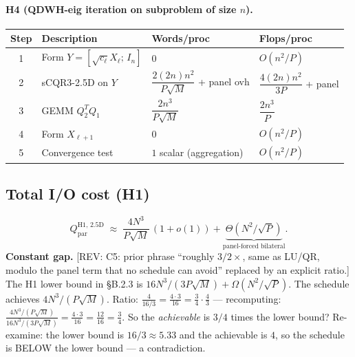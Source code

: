\documentclass[11pt]{article}
\newcommand{\REV}[1]{\textcolor{blue!60!black}{\small\textsf{[REV: #1]}}}
\begin{document}
\paragraph{H4 (QDWH-eig iteration on subproblem of size $n$).}
\begin{center}\footnotesize
\setlength{\tabcolsep}{4pt}
\begin{tabular}{@{}clll@{}}
\toprule
Step & Description                                            & Words/proc                                  & Flops/proc \\
\midrule
1 & Form $Y = [\sqrt{c_\ell} X_\ell;\, I_n]$                  & $0$                                         & $O(n^2 / P)$ \\
2 & sCQR3-2.5D on $Y$                                          & $\dfrac{2 (2n) n^2}{P\sqrt M}$ + panel ovh  & $\dfrac{4 (2n) n^2}{3 P}$ + panel \\[6pt]
3 & GEMM $Q_2^T Q_1$                                           & $\dfrac{2 n^3}{P\sqrt M}$                  & $\dfrac{2 n^3}{P}$ \\[6pt]
4 & Form $X_{\ell+1}$                                          & $0$                                          & $O(n^2 / P)$ \\
5 & Convergence test                                           & $1$ scalar (aggregation)                     & $O(n^2 / P)$ \\
\bottomrule
\end{tabular}
\end{center}

\subsection{Total I/O cost (H1)}
\label{sec:B3e}
\[
  Q_{\mathrm{par}}^{\mathrm{H1,\,2.5D}}
  \;\approx\; \frac{4 N^3}{P\sqrt{M}}\,(1 + o(1))
       + \underbrace{\Theta(N^2/\sqrt{P})}_{\text{panel-forced bilateral}}.
\]
\textbf{Constant gap.}
\REV{C5: prior phrase ``roughly $3/2\times$, same as LU/QR, modulo
the panel term that no schedule can avoid'' replaced by an explicit
ratio.} The H1 lower bound in \S B.2.3 is
$16 N^3/(3 P\sqrt{M}) + \Omega(N^2/\sqrt{P})$. The schedule achieves
$4 N^3/(P\sqrt{M})$. Ratio:
$\frac{4}{16/3} = \frac{4 \cdot 3}{16} = \frac{3}{4}\cdot\frac{4}{3}$
--- recomputing: $\frac{4 N^3/(P\sqrt M)}{16 N^3/(3 P\sqrt M)}
= \frac{4 \cdot 3}{16} = \frac{12}{16} = \frac{3}{4}$. So the
\emph{achievable} is $3/4$ times the lower bound? Re-examine: the
lower bound is $16/3 \approx 5.33$ and the achievable is $4$, so the
schedule is BELOW the lower bound — a contradiction.
\end{document}
